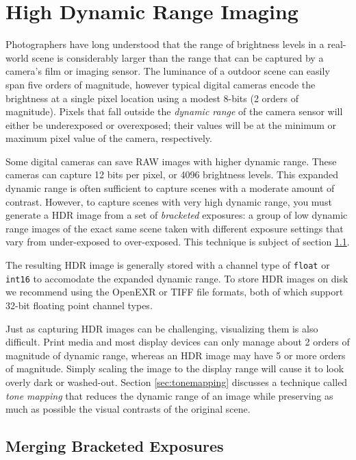 \chapter{High Dynamic Range Imaging}\label{ch:hdr-imaging}

Photographers have long understood that the range of brightness levels in
a real-world scene is considerably larger than the range that can be
captured by a camera's film or imaging sensor.  The luminance of a
outdoor scene can easily span five orders of magnitude, however
typical digital cameras encode the brightness at a single pixel
location using a modest 8-bits (2 orders of magnitude).  Pixels that
fall outside the {\em dynamic range} of the camera sensor will either
be underexposed or overexposed; their values will be at the minimum or
maximum pixel value of the camera, respectively.

Some digital cameras can save RAW images with higher dynamic range.
These cameras can capture 12 bits per pixel, or 4096 brightness
levels.  This expanded dynamic range is often sufficient to capture
scenes with a moderate amount of contrast. However, to capture scenes
with very high dynamic range, you must generate a HDR image from a set
of {\em bracketed} exposures: a group of low dynamic range images of
the exact same scene taken with different exposure settings that vary
from under-exposed to over-exposed.  This technique is subject of
section \ref{sec:hdr_merge}.

The resulting HDR image is generally stored with a channel type of
{\tt float} or {\tt int16} to accomodate the expanded dynamic range.
To store HDR images on disk we recommend using the OpenEXR or TIFF
file formats, both of which support 32-bit floating point channel
types.

Just as capturing HDR images can be challenging, visualizing them is
also difficult.  Print media and most display devices can only manage
about 2 orders of magnitude of dynamic range, whereas an HDR image may
have 5 or more orders of magnitude. Simply scaling the image to the
display range will cause it to look overly dark or washed-out. Section
\ref{sec:tonemapping} discusses a technique called {\em tone mapping}
that reduces the dynamic range of an image while preserving as much as
possible the visual contrasts of the original scene.

\section{Merging Bracketed Exposures}
\label{sec:hdr_merge}

